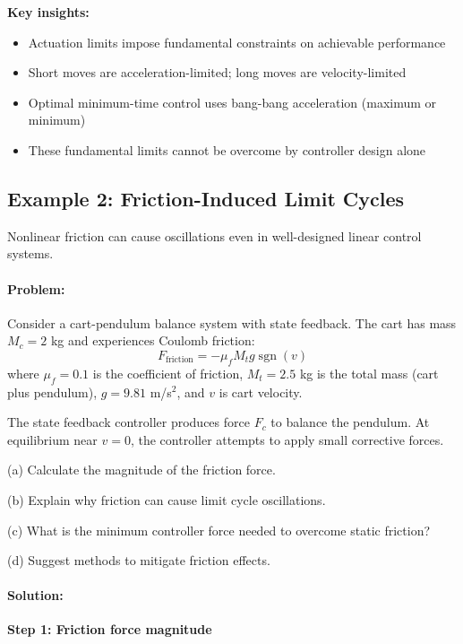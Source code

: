 \documentclass[11pt,a4paper]{article}
\begin{document}
\textbf{Key insights:}
\begin{itemize}
\item Actuation limits impose fundamental constraints on achievable performance
\item Short moves are acceleration-limited; long moves are velocity-limited
\item Optimal minimum-time control uses bang-bang acceleration (maximum or minimum)
\item These fundamental limits cannot be overcome by controller design alone
\end{itemize}

\subsection{Example 2: Friction-Induced Limit Cycles}

Nonlinear friction can cause oscillations even in well-designed linear control systems.

\paragraph{Problem:}
Consider a cart-pendulum balance system with state feedback. The cart has mass $M_c = 2$ kg and experiences Coulomb friction:
\begin{equation}
	F_{\text{friction}} = -\mu_f M_t g \operatorname{sgn}(v)
\end{equation}
where $\mu_f = 0.1$ is the coefficient of friction, $M_t = 2.5$ kg is the total mass (cart plus pendulum), $g = 9.81$ m/s$^2$, and $v$ is cart velocity.

The state feedback controller produces force $F_c$ to balance the pendulum. At equilibrium near $v = 0$, the controller attempts to apply small corrective forces.

(a) Calculate the magnitude of the friction force.

(b) Explain why friction can cause limit cycle oscillations.

(c) What is the minimum controller force needed to overcome static friction?

(d) Suggest methods to mitigate friction effects.

\paragraph{Solution:}

\textbf{Step 1: Friction force magnitude}
\end{document}

